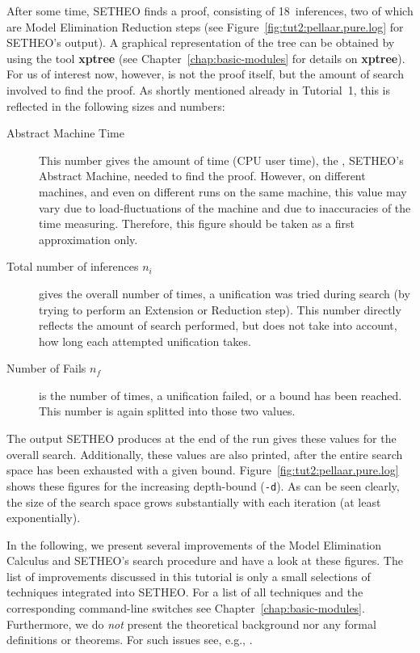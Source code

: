 After some time, SETHEO finds a proof, consisting of 18~inferences,
two of which are Model Elimination Reduction steps
(see Figure~\ref{fig:tut2:pellaar.pure.log} for SETHEO's output).
A graphical representation
of the tree can be obtained by using the tool {\bf xptree} (see
Chapter~\ref{chap:basic-modules} for details on {\bf xptree}).
For us of interest now, however, is not the proof itself, but the amount
of search involved to find the proof.
As shortly mentioned already in Tutorial~1, 
this is reflected in the following sizes and numbers:

\begin{description}
\item[Abstract Machine Time] 
This number gives the amount of time (CPU user time), the \SAM,
SETHEO's Abstract Machine, needed to find the proof.  
However, on different machines, and even on different runs on the same
machine, this value may vary due to load-fluctuations of the machine
and due to inaccuracies of the time measuring. 
Therefore, this figure should be taken as a first approximation only.

\item[Total number of inferences $n_i$] gives the overall number of times,
a unification was tried during search (by trying to perform an
Extension or Reduction step). This number directly reflects the amount
of search performed, but does not take into account, how long each
attempted unification takes.

\item[Number of Fails $n_f$] is the number of times, a unification failed,
or a bound has been reached. This number is again splitted into those
two values.
\end{description}

The output SETHEO produces at the end of the run gives these values
for the overall search. Additionally, these values are also
printed, after the entire search space has been exhausted with a given
bound. Figure~\ref{fig:tut2:pellaar.pure.log} shows these figures
for the increasing depth-bound ({\tt -d}). As can be seen clearly,
the size of the search space grows substantially with each iteration
(at least exponentially).

In the following, we present several improvements of the Model
Elimination Calculus and SETHEO's search procedure and have a look
at these figures.
The list of improvements discussed in this tutorial
is only a small selections of techniques integrated into SETHEO.
For a list of all techniques and the corresponding command-line
switches see Chapter~\ref{chap:basic-modules}.
Furthermore, we do {\em not\/} present the theoretical background
nor any formal definitions or theorems. For such issues see,
e.g., \cite{LSBB92,LMG94,Letzdiss,Mayrdiss}.

